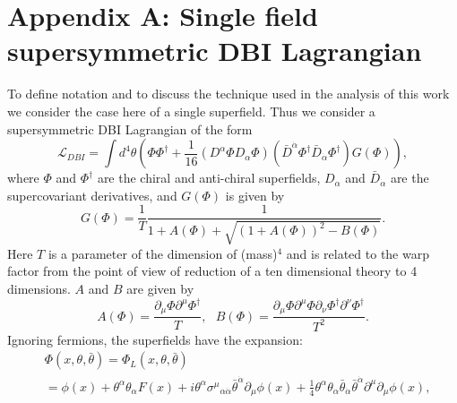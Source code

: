 \documentclass[a4paper,11pt]{article}
\begin{document}
\section{Appendix A: Single field supersymmetric DBI Lagrangian \label{appenA}}

	To define notation and to discuss the technique used in the analysis of this work we consider the case here of a single
	superfield. Thus we consider a supersymmetric DBI Lagrangian of the form~\cite{Rocek:1997hi,Tseytlin:1999dj,Sasaki:2012ka}	
	\begin{equation}\label{DisplayFormulaNumbered:eq.dbiSuperLagrangian}
		\mathcal{L}_{DBI}=\int d^4\theta \left(\Phi \Phi^\dagger+\frac{1}{16}\left(D^\alpha \Phi D_\alpha \Phi \right)\left({\bar{D}}^{\dot{\alpha}}\Phi^\dagger {\bar{D}}_{\dot{\alpha}}\Phi^\dagger \right)G\left(\Phi \right)\right),
	\end{equation}
	where $\Phi$ and $\Phi^\dagger$ are the chiral and anti-chiral superfields, $D_\alpha$ and ${\bar{D}}_{\dot{\alpha}}$ are the supercovariant derivatives, and $G(\Phi)$ is given by
	\begin{equation}\label{DisplayFormulaNumbered:eq.dbiG} 
		G\left(\Phi \right)=\frac{1}{T}\frac{1}{1+A\left(\Phi \right)+\sqrt{{\left(1+A\left(\Phi \right)\right)}^2-B\left(\Phi \right)}}.
	\end{equation}
	Here $T$ is a parameter of the dimension of (mass)$^4$ and is related to the warp factor from the point of view of reduction of a ten dimensional theory to 4 dimensions. $A$ and $B$ are given by
	\begin{equation}\label{DisplayFormulaNumbered:eq.dbiA}
		A\left(\Phi \right)=\frac{\partial_\mu \Phi \partial^\mu \Phi^\dagger}{T},
		~~~B\left(\Phi \right)=\frac{\partial_\mu \Phi \partial^\mu \Phi \partial_\nu \Phi^\dagger \partial^\nu \Phi^\dagger}{T^2}.
	\end{equation}
	Ignoring fermions, the superfields have the expansion:
	\begin{equation}
	\begin{split}
		& \Phi \left(x,\theta,\bar{\theta}\right)=\Phi_L\left(x,\theta,\bar{\theta}\right) \\
		& =\phi \left(x\right)+\theta^\alpha \theta_\alpha F\left(x\right)+i \theta^\alpha {\sigma^\mu}_{\alpha \dot{\alpha}}{\bar{\theta}}^{\dot{\alpha}}\partial_\mu \phi \left(x\right)+\frac{1}{4}\theta^\alpha \theta_\alpha {\bar{\theta}}_{\dot{\alpha}}{\bar{\theta}}^{\dot{\alpha}}\partial^\mu \partial_\mu \phi \left(x\right),
	\end{split}
	\end{equation}
\end{document}
